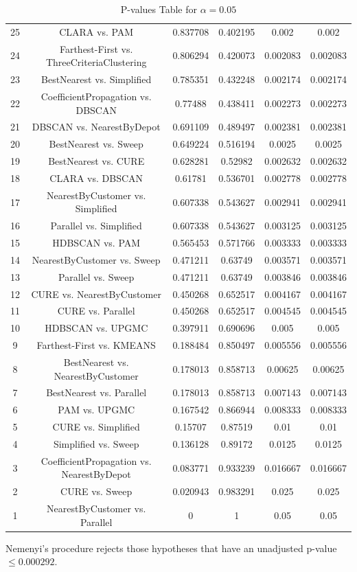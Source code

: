\documentclass[a4paper,10pt]{article}
\begin{document}
\begin{landscape}
\begin{table}[!htp]
\begin{tabular}{cccccc}
25&CLARA vs. PAM&0.837708&0.402195&0.002&0.002\\
24&Farthest-First vs. ThreeCriteriaClustering&0.806294&0.420073&0.002083&0.002083\\
23&BestNearest vs. Simplified&0.785351&0.432248&0.002174&0.002174\\
22&CoefficientPropagation vs. DBSCAN&0.77488&0.438411&0.002273&0.002273\\
21&DBSCAN vs. NearestByDepot&0.691109&0.489497&0.002381&0.002381\\
20&BestNearest vs. Sweep&0.649224&0.516194&0.0025&0.0025\\
19&BestNearest vs. CURE&0.628281&0.52982&0.002632&0.002632\\
18&CLARA vs. DBSCAN&0.61781&0.536701&0.002778&0.002778\\
17&NearestByCustomer vs. Simplified&0.607338&0.543627&0.002941&0.002941\\
16&Parallel vs. Simplified&0.607338&0.543627&0.003125&0.003125\\
15&HDBSCAN vs. PAM&0.565453&0.571766&0.003333&0.003333\\
14&NearestByCustomer vs. Sweep&0.471211&0.63749&0.003571&0.003571\\
13&Parallel vs. Sweep&0.471211&0.63749&0.003846&0.003846\\
12&CURE vs. NearestByCustomer&0.450268&0.652517&0.004167&0.004167\\
11&CURE vs. Parallel&0.450268&0.652517&0.004545&0.004545\\
10&HDBSCAN vs. UPGMC&0.397911&0.690696&0.005&0.005\\
9&Farthest-First vs. KMEANS&0.188484&0.850497&0.005556&0.005556\\
8&BestNearest vs. NearestByCustomer&0.178013&0.858713&0.00625&0.00625\\
7&BestNearest vs. Parallel&0.178013&0.858713&0.007143&0.007143\\
6&PAM vs. UPGMC&0.167542&0.866944&0.008333&0.008333\\
5&CURE vs. Simplified&0.15707&0.87519&0.01&0.01\\
4&Simplified vs. Sweep&0.136128&0.89172&0.0125&0.0125\\
3&CoefficientPropagation vs. NearestByDepot&0.083771&0.933239&0.016667&0.016667\\
2&CURE vs. Sweep&0.020943&0.983291&0.025&0.025\\
1&NearestByCustomer vs. Parallel&0&1&0.05&0.05\\
\hline
\end{tabular}
\caption{P-values Table for $\alpha=0.05$}
\end{table}Nemenyi's procedure rejects those hypotheses that have an unadjusted p-value $\le0.000292$.


\end{landscape}
\end{document}
